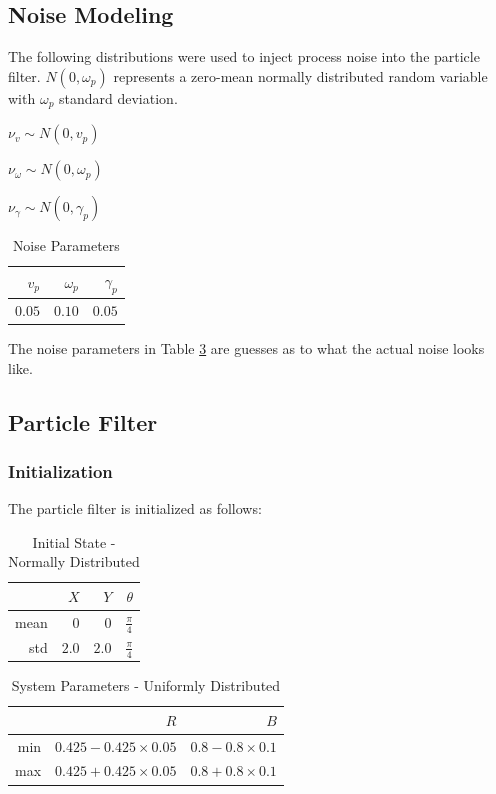 \documentclass[twoside,twocolumn]{article}
\begin{document}
\subsection{Noise Modeling}

The following distributions were used to inject process noise into the particle filter.
$N(0,\omega_p)$ represents a zero-mean normally distributed random variable with $\omega_p$ standard deviation.

\begin{center}
$\nu_v \sim  N(0, v_p)$

$\nu_\omega \sim N(0, \omega_p)$

$\nu_\gamma \sim N(0, \gamma_p) $
\end{center}

\begin{table}[h!]
\centering
\caption{Noise Parameters}
\label{table:noise}
\begin{tabular}{rrr}
\hline
$v_p$ & $\omega_p$ & $\gamma_p$ \\ [0.5ex] 
\hline
$0.05$ & $0.10$ & $0.05$\\
\hline
\end{tabular}
\end{table}

The noise parameters in Table \ref{table:noise} are guesses as to what the actual noise looks like.

\subsection{Particle Filter}

\subsubsection{Initialization}
The particle filter is initialized as follows:

\begin{table}[h!]
\centering
\caption{Initial State - Normally Distributed}
\label{table:noise}
\begin{tabular}{rrrr}
\hline
 &$X$ & $Y$ & $\theta$ \\ [0.5ex] 
\hline
mean & $0$ & $0$ & $\frac{\pi}{4}$\\
std & $2.0$ & $2.0$ & $\frac{\pi}{4}$\\
\hline
\end{tabular}
\end{table}

\begin{table}[h!]
\centering
\caption{System Parameters - Uniformly Distributed}
\label{table:noise}
\begin{tabular}{rrr}
\hline
 &$R$ & $B$\\ [0.5ex] 
\hline
min & $0.425 - 0.425\times0.05$ & $0.8 - 0.8 \times 0.1$\\
max & $0.425 + 0.425\times0.05$ & $0.8 + 0.8 \times 0.1$\\
\hline
\end{tabular}
\end{table}
\end{document}
